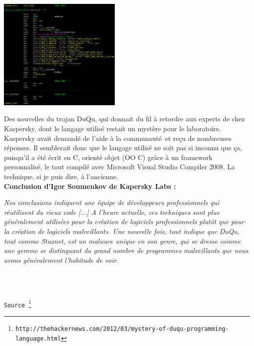 \documentclass[11pt,twoside,a4paper]{article}
\begin{document}
\begin{minipage}[ht]{6.25cm}
	\includegraphics[width=6.00cm]{img/Duqu.png}
\end{minipage} \hfill \begin{minipage}[ht]{12.50cm}
	\small
	Des nouvelles du trojan DuQu, qui donnait du fil {\`a} retordre aux experts de chez Kaspersky, dont le langage utilis{\'e} restait un myst{\`e}re pour le laboratoire. Kaspersky avait demand{\'e} de l'aide {\`a} la communaut{\'e}~\footnotemark et re\c{c}u de nombreuses r{\'e}ponses. Il semblerait donc que le langage utilis{\'e} ne soit pas si inconnu que \c{c}a, puisqu'il a {\'e}t{\'e} {\'e}crit en C, orient{\'e} objet (OO C) gr{\^a}ce {\`a} un framework personnalis{\'e}, le tout compil{\'e} avec Microsoft Visual Studio Compiler 2008. La technique, si je puis dire, {\`a} l'ancienne.~\\
	
	\textbf{Conclusion d'Igor Soumenkov de Kapersky Labs :}

	\emph{Nos conclusions indiquent une {\'e}quipe de d{\'e}veloppeurs professionnels qui r{\'e}utilisent du vieux code [...] A l'heure actuelle, ces techniques sont plus g{\'e}n{\'e}ralement utilis{\'e}es pour la cr{\'e}ation de logiciels professionnels plut{\^o}t que pour la cr{\'e}ation de logiciels malveillants. Une nouvelle fois, tout indique que DuQu, tout comme Stuxnet, est un malware unique en son genre, qui se dresse comme une gemme se distinguant du grand nombre de programmes malveillants que nous avons g{\'e}n{\'e}ralement l'habitude de voir.}~\\
\end{minipage}~\\
~


\texttt{Source~\footnote{\texttt{http://thehackernews.com/2012/03/mystery-of-duqu-programming-language.html}}}

\clearpage
\end{document}
